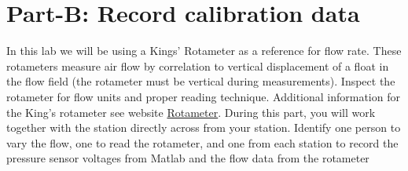 \documentclass{article} %
\begin{document}
\section{Part-B: Record calibration data}
In this lab we will be using a Kings’ Rotameter as a reference for flow rate. These rotameters measure air flow by correlation to vertical displacement of a float in the flow field (the rotameter must be vertical during measurements). Inspect the rotameter for flow units and proper reading technique. Additional information for the King's rotameter see website \href{https://kinginstrumentco.com/glass-flowmeters/}{Rotameter}.
During this part, you will work together with the station directly across from your station. Identify one person to vary the flow, one to read the rotameter, and one from each station to record the pressure sensor voltages from Matlab and the flow data from the rotameter
\end{document}
